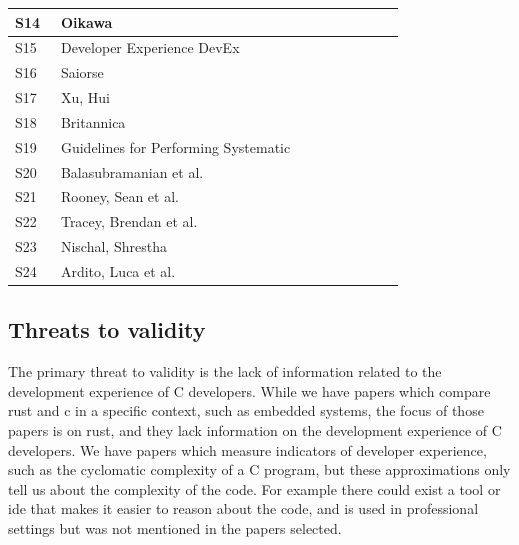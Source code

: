 \documentclass[conference]{IEEEtran}
\begin{document}
\begin{table}[!htbp]
\begin{tabular}{p{0.1\linewidth}p{0.65\linewidth}p{0.1\linewidth}}
        \hline
        S14 & Oikawa                               & \cite{oikawaExperienceDevelopingFAT2023}                    \\
        \hline
        S15 & Developer Experience DevEx           & \cite{DeveloperExperienceDevEx}                             \\
        \hline
        S16 & Saiorse                              & \cite{saoirseWhyAsyncRust2023}                              \\
        \hline
        S17 & Xu, Hui                              & \cite{xuMemorySafetyChallengeConsidered2021}                \\
        \hline
        S18 & Britannica                           & \cite{SystemsProgrammingDefinition}                         \\
        \hline
        S19 & Guidelines for Performing Systematic & \cite{GuidelinesPerformingSystematic}                       \\
        \hline
        S20 & Balasubramanian et al.               & \cite{balasubramanianSystemProgrammingRust2017}             \\
        \hline
        S21 & Rooney, Sean et al.                  & \cite{rooneyEvaluatingFFTPerformance2023}                   \\
        \hline
        S22 & Tracey, Brendan et al.               & \cite{traceyGradingCurveHow2023}                            \\
        \hline
        S23 & Nischal, Shrestha                    & \cite{shresthaHereWeGo2020}                                 \\
        \hline
        S24 & Ardito, Luca et al.                  & \cite{arditoEvaluationRustCode2021}                         \\
        \hline

    \end{tabular}
\end{table}
\subsection{Threats to validity}
{
    The primary threat to validity is the lack of information related to the development experience of C developers. While we have papers which compare rust and c in a specific context, such as embedded systems,
    the focus of those papers is on rust, and they lack information on the development experience of C developers. We have papers which measure indicators of developer experience, such as the cyclomatic complexity
    of a C program, but these approximations only tell us about the complexity of the code. For example there could exist a tool or ide that makes it easier to reason about the code, and is used in professional settings but
    was not mentioned in the papers selected.
}
\end{document}

